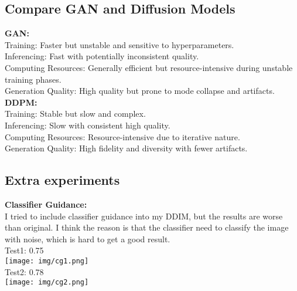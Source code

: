 \documentclass{article} %
\begin{document}
    \subsection{Compare GAN and Diffusion Models}
    \textbf{GAN:} \\
    Training: Faster but unstable and sensitive to hyperparameters. \\
    Inferencing: Fast with potentially inconsistent quality. \\
    Computing Resources: Generally efficient but resource-intensive during unstable training phases. \\
    Generation Quality: High quality but prone to mode collapse and artifacts. \\
    \textbf{DDPM:} \\
    Training: Stable but slow and complex.\\
    Inferencing: Slow with consistent high quality.\\
    Computing Resources: Resource-intensive due to iterative nature.\\
    Generation Quality: High fidelity and diversity with fewer artifacts. \\
    \subsection{Extra experiments}
    \textbf{Classifier Guidance:} \\
    I tried to include classifier guidance into my DDIM, but the results are worse than original. I think the reason is that the classifier need to classify the image with noise, which is hard to get a good result. \\
    Test1: 0.75 \\
    \texttt{[image: img/cg1.png]} \\
    Test2: 0.78 \\
    \texttt{[image: img/cg2.png]} \\
    
\end{document}
